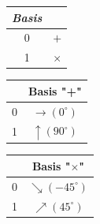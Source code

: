 \begin{table}[H]
\centering
\begin{tabular}{c|c}
\textbf{\textit{Basis}}         &  \\ \hline
 0 & $+$ \\
 1 & $\times$ \\
\end{tabular}
\end{table}


\begin{table}[H]
\centering
\begin{tabular}{c|c}
            & Basis "+" \\ \hline
 0 & $\to (0^{\circ})$ \\
 1 & $\uparrow (90^{\circ})$ \\
\end{tabular}
\end{table}


\begin{table}[H]
\centering
\begin{tabular}{c|c}
      & Basis "$\times$" \\ \hline
 0 & $\searrow (-45^{\circ})$ \\
 1 & $\nearrow (45^{\circ})$ \\
\end{tabular}
\end{table}


